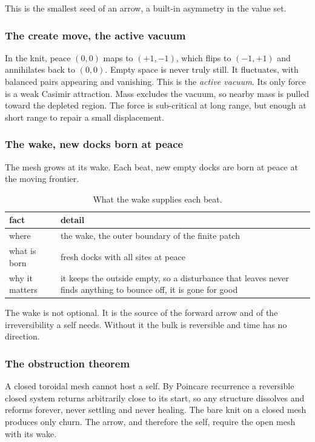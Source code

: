This is the smallest seed of an arrow, a built-in asymmetry in the value set.

\subsubsection{The create move, the active vacuum}

In the knit, peace $(0, 0)$ maps to $(+1, -1)$, which flips to $(-1, +1)$ and annihilates back to $(0, 0)$. Empty space is never truly still. It fluctuates, with balanced pairs appearing and vanishing. This is the \emph{active vacuum}. Its only force is a weak Casimir attraction. Mass excludes the vacuum, so nearby mass is pulled toward the depleted region. The force is sub-critical at long range, but enough at short range to repair a small displacement.

\subsubsection{The wake, new docks born at peace}

The mesh grows at its wake. Each beat, new empty docks are born at peace at the moving frontier.

\begin{table}[ht]
\centering
\begin{tabular}{@{}p{}p{}@{}}
\toprule
fact & detail \\
\midrule
where & the wake, the outer boundary of the finite patch \\
what is born & fresh docks with all sites at peace \\
why it matters & it keeps the outside empty, so a disturbance that leaves never finds anything to bounce off, it is gone for good \\
\bottomrule
\end{tabular}
\caption{What the wake supplies each beat.}
\label{tab:wake-facts}
\end{table}

The wake is not optional. It is the source of the forward arrow and of the irreversibility a self needs. Without it the bulk is reversible and time has no direction.

\subsubsection{The obstruction theorem}

\begin{theorem}
A closed toroidal mesh cannot host a self. By Poincare recurrence a reversible closed system returns arbitrarily close to its start, so any structure dissolves and reforms forever, never settling and never healing. The bare knit on a closed mesh produces only churn. The arrow, and therefore the self, require the open mesh with its wake.
\end{theorem}

